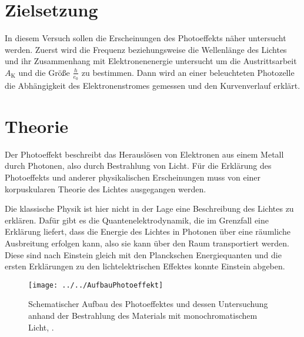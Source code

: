 \section{Zielsetzung}
\label{sec:Zielsetzung}
In diesem Versuch sollen die Erscheinungen des Photoeffekts näher untersucht werden. Zuerst wird die Frequenz beziehungsweise die Wellenlänge des Lichtes und ihr Zusammenhang mit Elektronenenergie untersucht um die Austrittsarbeit $A_\text{K}$ und die Größe $\frac{h}{e_0}$ zu bestimmen.
Dann wird an einer beleuchteten Photozelle die Abhängigkeit des Elektronenstromes gemessen und den Kurvenverlauf erklärt.

\section{Theorie}
\label{sec:Theorie}
Der Photoeffekt beschreibt das Herauslösen von Elektronen aus einem Metall durch Photonen, also durch Bestrahlung von Licht. Für die Erklärung des Photoeffekts und anderer physikalischen Erscheinungen muss von einer korpuskularen Theorie des Lichtes ausgegangen werden. 

Die klassische Physik ist hier nicht in der Lage eine Beschreibung des Lichtes zu erklären. Dafür gibt es die Quantenelektrodynamik, die im Grenzfall eine Erklärung liefert, dass die Energie des Lichtes in Photonen über eine räumliche Ausbreitung erfolgen kann, also sie kann über den Raum transportiert werden. Diese sind nach Einstein gleich mit den Planckschen Energiequanten und die ersten Erklärungen zu den lichtelektrischen Effektes konnte Einstein abgeben.

\begin{figure}[h!]
	\centering
	\texttt{[image: ../../AufbauPhotoeffekt]}
	\caption{Schematischer Aufbau des Photoeffektes und dessen Untersuchung anhand der Bestrahlung des Materials mit monochromatischem Licht, \cite[2]{anleitung500}.}
	\label{fig:aufbauphotoeffekt}
\end{figure}

